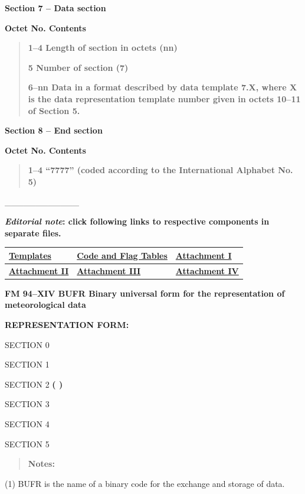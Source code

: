 \textbf{Section 7 -- Data section}

\textbf{Octet No. Contents}

\begin{quote}
\textbf{1--4 Length of section in octets (nn)}

\textbf{5 Number of section (7)}

\textbf{6--nn Data in a format described by data template 7.X, where X is the data representation template number given in octets 10--11 of Section 5.}
\end{quote}

\textbf{Section 8 -- End section\\
}

\textbf{Octet No. Contents}

\begin{quote}
\textbf{1--4 ``7777'' (coded according to the International Alphabet No. 5)}
\end{quote}

\_\_\_\_\_\_\_\_\_\_\_\_

\textbf{\emph{Editorial note}: click following links to respective components in separate files.}

\begin{longtable}[]{@{}lll@{}}
\toprule
\href{WMO306_vI2_GRIB2_Template_en.docx}{\textbf{Templates}} & \href{WMO306_vI2_GRIB2_CodeFlag_en.docx}{\textbf{Code and Flag Tables}} & \href{WMO306_vI2_GRIB_att1_en.pdf}{\textbf{Attachment I}}\tabularnewline
\midrule
\endhead
\href{WMO306_vI2_GRIB_att2_en.docx}{\textbf{Attachment II}} & \href{WMO306_vI2_GRIB_att3_en.docx}{\textbf{Attachment III}} & \href{WMO306_vI2_GRIB_att4_en.docx}{\textbf{Attachment IV}}\tabularnewline
\bottomrule
\end{longtable}

\textbf{FM 94--XIV BUFR Binary universal form for the representation of meteorological data}

\textbf{REPRESENTATION FORM:}

SECTION 0

SECTION 1

SECTION 2 \textbf{( )}

SECTION 3

SECTION 4

SECTION 5

\begin{quote}
\textbf{Notes:}
\end{quote}

(1) BUFR is the name of a binary code for the exchange and storage of data.

